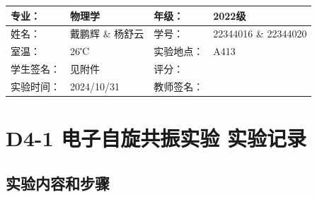 \documentclass[dvipsnames, svgnames,a4paper,11pt]{article}
\begin{document}










\clearpage
\begin{table}
	\renewcommand\arraystretch{1.7}
	\centering
	\begin{tabularx}{\textwidth}{|X|X|X|X|}
	\hline
	专业：& 物理学 &年级：& 2022级 \\
	\hline
	姓名：& 戴鹏辉 \& 杨舒云 & 学号：& 22344016 \& 22344020 \\
	\hline
	室温：& 26℃ & 实验地点： & A413 \\
	\hline
	学生签名：& 见附件 & 评分： &\\
	\hline
	实验时间：& 2024/10/31& 教师签名：&\\
	\hline
	\end{tabularx}
\end{table}

\section{D4-1 \quad 电子自旋共振实验 \quad\heiti 实验记录}

\subsection{实验内容和步骤}
\end{document}

